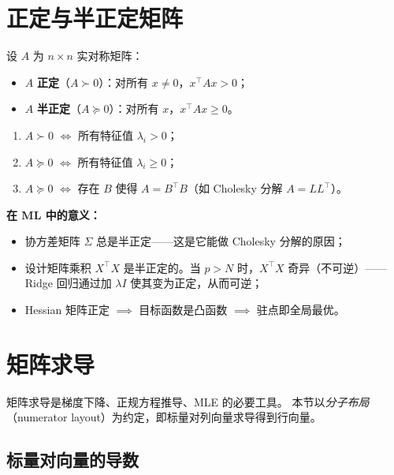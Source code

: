 \section{正定与半正定矩阵}

\begin{definition}[正定与半正定]
设 $A$ 为 $n \times n$ 实对称矩阵：
\begin{itemize}
    \item $A$ \textbf{正定}（$A \succ 0$）：对所有 $x \neq 0$，$x^\top A x > 0$；
    \item $A$ \textbf{半正定}（$A \succeq 0$）：对所有 $x$，$x^\top A x \ge 0$。
\end{itemize}
\end{definition}

\begin{proposition}[等价条件]
\begin{enumerate}[label=(\arabic*)]
    \item $A \succ 0$ $\iff$ 所有特征值 $\lambda_i > 0$；
    \item $A \succeq 0$ $\iff$ 所有特征值 $\lambda_i \ge 0$；
    \item $A \succeq 0$ $\iff$ 存在 $B$ 使得 $A = B^\top B$（如 Cholesky 分解 $A = LL^\top$）。
\end{enumerate}
\end{proposition}

\textbf{在 ML 中的意义：}
\begin{itemize}
    \item 协方差矩阵 $\Sigma$ 总是半正定——这是它能做 Cholesky 分解的原因；
    \item 设计矩阵乘积 $X^\top X$ 是半正定的。当 $p > N$ 时，$X^\top X$ 奇异（不可逆）——
    Ridge 回归通过加 $\lambda I$ 使其变为正定，从而可逆；
    \item Hessian 矩阵正定 $\implies$ 目标函数是凸函数 $\implies$ 驻点即全局最优。
\end{itemize}

\section{矩阵求导}

矩阵求导是梯度下降、正规方程推导、MLE 的必要工具。
本节以\emph{分子布局}（numerator layout）为约定，即标量对列向量求导得到行向量。

\subsection{标量对向量的导数}

